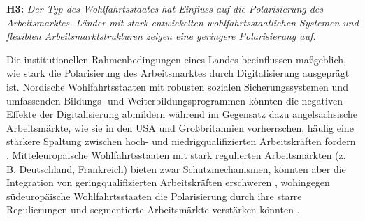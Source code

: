 \textbf{H3:} \textit{Der Typ des Wohlfahrtsstaates hat Einfluss auf die Polarisierung des 
Arbeitsmarktes. Länder mit stark entwickelten wohlfahrtsstaatlichen Systemen und flexiblen 
Arbeitsmarktstrukturen zeigen eine geringere Polarisierung auf.}

Die institutionellen Rahmenbedingungen eines Landes beeinflussen maßgeblich, wie stark die 
Polarisierung des Arbeitsmarktes durch Digitalisierung ausgeprägt ist. Nordische 
Wohlfahrtsstaaten mit robusten sozialen Sicherungssystemen und umfassenden Bildungs- und 
Weiterbildungsprogrammen könnten die negativen Effekte der Digitalisierung abmildern 
\parencite[S. 27–28]{espingandersen1990thethree} während im Gegensatz dazu  angelsächsische 
Arbeitsmärkte, wie sie in den USA und Großbritannien vorherrschen, häufig eine stärkere Spaltung 
zwischen hoch- und niedrigqualifizierten Arbeitskräften fördern
\parencite[vgl.][S. 28–30]{hall2001varieties}. Mitteleuropäische Wohlfahrtsstaaten mit stark 
regulierten Arbeitsmärkten (z. B. Deutschland, Frankreich) bieten zwar Schutzmechanismen, könnten 
aber die Integration von geringqualifizierten Arbeitskräften erschweren 
\parencite[vgl.][S. 25–26]{hall2001varieties}, wohingegen südeuropäische Wohlfahrtsstaaten die 
Polarisierung durch ihre starre Regulierungen und segmentierte Arbeitsmärkte verstärken könnten 
\parencite[S. 19–21]{ferrera1996thesouthern}.
